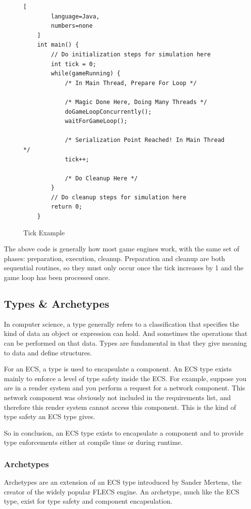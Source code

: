 \begin{figure}[H]
    \begin{lstlisting}[
        language=Java,
        numbers=none
    ]
    int main() {
        // Do initialization steps for simulation here
        int tick = 0;
        while(gameRunning) {
            /* In Main Thread, Prepare For Loop */    

            /* Magic Done Here, Doing Many Threads */
            doGameLoopConcurrently();
            waitForGameLoop();

            /* Serialization Point Reached! In Main Thread */
            tick++;

            /* Do Cleanup Here */
        }
        // Do cleanup steps for simulation here
        return 0;
    }
\end{lstlisting}
    \caption{Tick Example}
    \label{code:naive_ecs_data}
\end{figure}

The above code is generally how most game engines work, with the same set of phases: preparation, execution, cleanup. Preparation and cleanup are both sequential routines, so they must only occur once the tick increases by 1 and the game loop has been processed once.

\subsection{Types \& Archetypes}
In computer science, a type generally refers to a classification that specifies the kind of data an object or expression can hold. And sometimes the operations that can be performed on that data. Types are fundamental in that they give meaning to data and define structures. 

For an ECS, a type is used to encapsulate a component. An ECS type exists mainly to enforce a level of type safety inside the ECS. For example, suppose you are in a render system and you perform a request for a network component. This network component was obviously not included in the requirements list, and therefore this render system cannot access this component. This is the kind of type safety an ECS type gives.

So in conclusion, an ECS type exists to encapsulate a component and to provide type enforcements either at compile time or during runtime.

\subsubsection{Archetypes}
Archetypes are an extension of an ECS type introduced by Sander Mertens, the creator of the widely popular FLECS engine. An archetype, much like the ECS type, exist for type safety and component encapsulation. 

